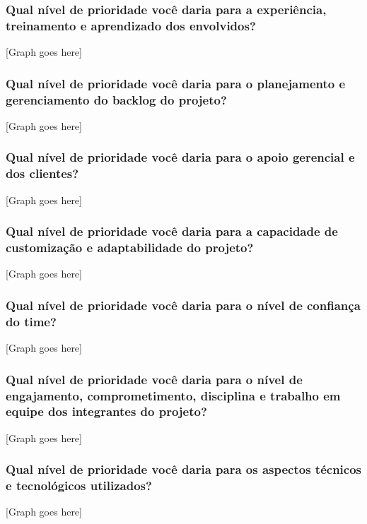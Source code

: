 \subsubsection{Qual nível de prioridade você daria para a experiência, treinamento e aprendizado dos envolvidos?}

[Graph goes here]

\subsubsection{Qual nível de prioridade você daria para o planejamento e gerenciamento do backlog do projeto?}

[Graph goes here]

\subsubsection{Qual nível de prioridade você daria para o apoio gerencial e dos clientes?}

[Graph goes here]

\subsubsection{Qual nível de prioridade você daria para a capacidade de customização e adaptabilidade do projeto?}

[Graph goes here]

\subsubsection{Qual nível de prioridade você daria para o nível de confiança do time?}

[Graph goes here]

\subsubsection{Qual nível de prioridade você daria para o nível de engajamento, comprometimento, disciplina e trabalho em equipe dos integrantes do projeto?}

[Graph goes here]

\subsubsection{Qual nível de prioridade você daria para os aspectos técnicos e tecnológicos utilizados?}

[Graph goes here]

